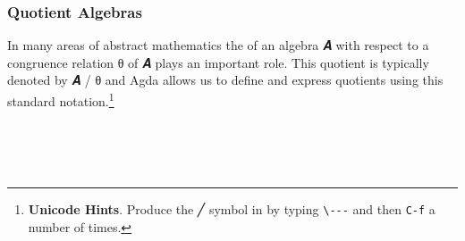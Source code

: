 \subsubsection*{Quotient Algebras} %
In many areas of abstract mathematics the  of an algebra \ab 𝑨 with respect to a congruence relation \ab θ of \ab 𝑨 plays an important role. This quotient is typically denoted by \ab 𝑨 \af / \ab θ and Agda allows us to define and express quotients using this standard notation.\footnote{%
\textbf{Unicode Hints}. Produce the ╱ symbol in \agdamode by typing \texttt{\textbackslash{}-\/-\/-} and then \texttt{C-f} a number of times.}
\ccpad
\begin{code}%
\>[0][@{}l@{\AgdaIndent{0}}]%
\>[1]\AgdaSpace{}%
\AgdaSymbol{:}\AgdaSpace{}%
\AgdaSymbol{(}\AgdaSpace{}%
\AgdaSymbol{:}\AgdaSpace{}%
\AgdaSpace{}%
\AgdaSpace{}%
\AgdaSymbol{)}\AgdaSpace{}%
\AgdaSpace{}%
\AgdaSymbol{\{}\AgdaSymbol{\}}\AgdaSpace{}%
\AgdaSpace{}%
\AgdaSpace{}%
\AgdaSpace{}%
\AgdaSymbol{(}\AgdaSpace{}%
\AgdaSpace{}%
\AgdaSpace{}%
\AgdaSymbol{)}\AgdaSpace{}%
\<%
\\
%
\\[\AgdaEmptyExtraSkip]%
%
\>[1]\AgdaSpace{}%
\AgdaSpace{}%
\AgdaSpace{}%
\AgdaSymbol{=}%
\>[277I]\AgdaSymbol{(}\AgdaSpace{}%
\AgdaSpace{}%
\AgdaSpace{}%
\AgdaOperator{\AgdaFunction{/}}\AgdaSpace{}%
\AgdaSpace{}%
\AgdaSpace{}%
\AgdaSymbol{)}%
\>[26]\AgdaOperator{\AgdaInductiveConstructor{,}}%
\>[59]\<%
\\
%
\>[.][@{}l@{}]\<[277I]%
\>[9]\AgdaSpace{}%
\AgdaSpace{}%
\AgdaSpace{}%
\AgdaSpace{}%
\AgdaSpace{}%
\AgdaSymbol{(}\AgdaSpace{}%
\AgdaSpace{}%
\AgdaSpace{}%
\AgdaSpace{}%
%
\>[34]\AgdaSpace{}%
\AgdaSpace{}%
\AgdaSpace{}%
\AgdaSpace{}%
\AgdaSymbol{)}\AgdaSpace{}%
%
\>[59]\<%
\end{code}
